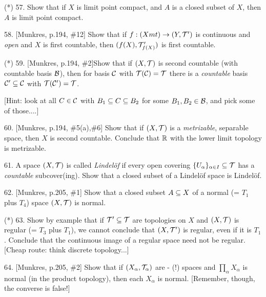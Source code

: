 \documentclass[12pt]{article}
\begin{document}
\begin{description}



\item{(*)} 57. Show that if $X$ is limit point compact, and $A$ is a closed subset of $X$, then
$A$ is limit point compact.

\msk

\item{58.} [Munkres, p.194, \#12] Show that if $f:(X\\mt)\rightarrow(Y,{\mathcal T}^\prime)$ is continuous and {\it open} and $X$ is first countable, 
then $(f(X),{\mathcal T}^\prime_{f(X)})$ is first countable.

\msk

\item{(*)} 59. [Munkres, p.194, \#2]Show that if $(X,{\mathcal T})$ is second countable (with countable basis ${\mathcal B}$), 
then for  basis ${\mathcal C}$ 
with ${\mathcal T}({\mathcal C})={\mathcal T}$ there is a {\it countable} basis ${\mathcal C}^\prime\subseteq{\mathcal C}$ with ${\mathcal T}({\mathcal C}^\prime)={\mathcal T}$.

\ssk

\item{\spc} [Hint: look at all $C\in{\mathcal C}$ with $B_1\subseteq C\subseteq B_2$ for some $B_1,B_2\in{\mathcal B}$, and pick some of those....]
\msk

\item{60.} [Munkres, p.194, \#5(a),\#6] Show that if $(X,{\mathcal T})$ is a {\it metrizable}, separable space, then 
$X$ is second countable. Conclude that ${\mathbb R}$ with the lower limit topology is  metrizable.

\msk

\item{61.} A space $(X,{\mathcal T})$ is called {\it Lindel\"of} if every
open covering $\{U_\alpha\}_{\alpha\in I}\subseteq{\mathcal T}$ has a {\it countable}
subcover(ing). Show that a closed subset of a Lindel\"of space is Lindel\"of.

\msk

\item{62.} [Munkres, p.205, \#1] Show that a closed subset $A\subseteq X$ of a normal (= $T_1$ plus $T_4$) space
$(X,{\mathcal T})$ is normal.

\msk

\item{(*)} 63. Show by example that if ${\mathcal T}^\prime\subseteq{\mathcal T}$ are topologies on $X$ and $(X,{\mathcal T})$ is regular (= $T_3$ plus $T_1$),
we cannot conclude that $(X,{\mathcal T}^\prime)$ is regular, even if it is $T_1$. Conclude that the continuous image
of a regular space need not be regular. [Cheap route: think discrete topology...]

\msk

\item{64.} [Munkres, p.205, \#2] Show that if $(X_\alpha,{\mathcal T}_\alpha)$ are - (!) spaces and 
$\prod_\alpha X_\alpha$ is normal (in the product topology), then each $X_\alpha$ is normal. [Remember, though, the
converse is false!]


\end{description}
\vfill
\end{document}
